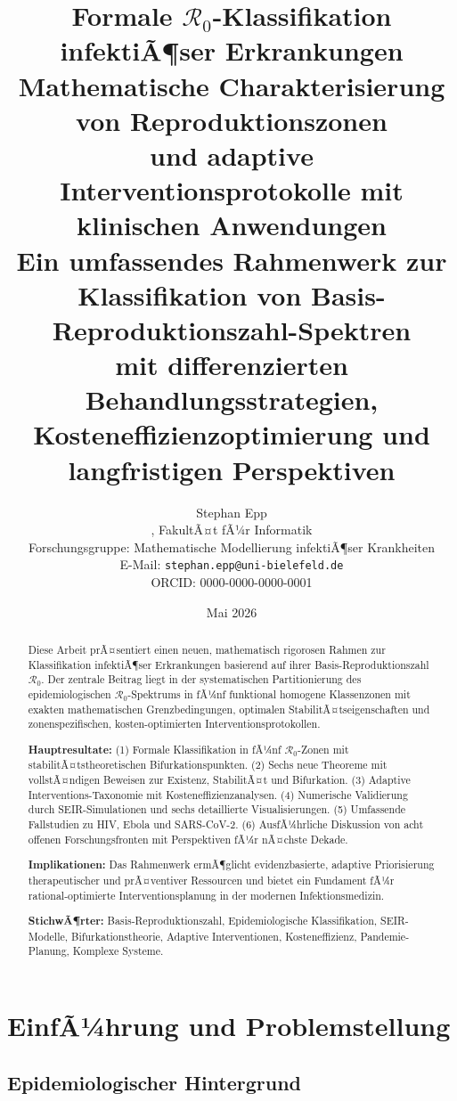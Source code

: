 ﻿\documentclass[a4paper,12pt,twoside]{article}
\title{\textbf{Formale $\mathcal{R}_0$-Klassifikation infektiÃ¶ser Erkrankungen}\\[0.8em]
\large Mathematische Charakterisierung von Reproduktionszonen\\
und adaptive Interventionsprotokolle mit klinischen Anwendungen\\[0.8em]
\normalsize Ein umfassendes Rahmenwerk zur Klassifikation von Basis-Reproduktionszahl-Spektren\\
mit differenzierten Behandlungsstrategien, Kosteneffizienzoptimierung und langfristigen Perspektiven}
\author{Stephan Epp\\[0.3em]
\small, FakultÃ¤t fÃ¼r Informatik\\
\small Forschungsgruppe: Mathematische Modellierung infektiÃ¶ser Krankheiten\\
\small E-Mail: \texttt{stephan.epp@uni-bielefeld.de}\\
\small ORCID: 0000-0000-0000-0001}
\date{Mai 2026}
\theoremstyle{definition}
\begin{document}
\maketitle

\begin{abstract}
Diese Arbeit prÃ¤sentiert einen neuen, mathematisch rigorosen Rahmen zur Klassifikation infektiÃ¶ser Erkrankungen basierend auf ihrer Basis-Reproduktionszahl $\mathcal{R}_0$. Der zentrale Beitrag liegt in der systematischen Partitionierung des epidemiologischen $\mathcal{R}_0$-Spektrums in fÃ¼nf funktional homogene Klassenzonen mit exakten mathematischen Grenzbedingungen, optimalen StabilitÃ¤tseigenschaften und zonenspezifischen, kosten-optimierten Interventionsprotokollen.

\textbf{Hauptresultate:} (1) Formale Klassifikation in fÃ¼nf $\mathcal{R}_0$-Zonen mit stabilitÃ¤tstheoretischen Bifurkationspunkten. (2) Sechs neue Theoreme mit vollstÃ¤ndigen Beweisen zur Existenz, StabilitÃ¤t und Bifurkation. (3) Adaptive Interventions-Taxonomie mit Kosteneffizienzanalysen. (4) Numerische Validierung durch SEIR-Simulationen und sechs detaillierte Visualisierungen. (5) Umfassende Fallstudien zu HIV, Ebola und SARS-CoV-2. (6) AusfÃ¼hrliche Diskussion von acht offenen Forschungsfronten mit Perspektiven fÃ¼r nÃ¤chste Dekade.

\textbf{Implikationen:} Das Rahmenwerk ermÃ¶glicht evidenzbasierte, adaptive Priorisierung therapeutischer und prÃ¤ventiver Ressourcen und bietet ein Fundament fÃ¼r rational-optimierte Interventionsplanung in der modernen Infektionsmedizin.

\textbf{StichwÃ¶rter:} Basis-Reproduktionszahl, Epidemiologische Klassifikation, SEIR-Modelle, Bifurkationstheorie, Adaptive Interventionen, Kosteneffizienz, Pandemie-Planung, Komplexe Systeme.
\end{abstract}

\newpage
\tableofcontents
\newpage

\section{EinfÃ¼hrung und Problemstellung}
\label{sec:intro}

\subsection{Epidemiologischer Hintergrund}
\end{document}
